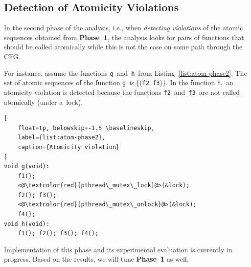 \documentclass{ExcelAtFIT}
\begin{document}
\subsection{Detection of Atomicity Violations}
\label{sec:atomicity-phase2}

In the second phase of the analysis, i.e.,
when \emph{detecting violations} of the atomic
sequences obtained from \textbf{Phase~1}, the
analysis looks for pairs of functions that should
be called atomically while this is not the case
on some path through the CFG.

For instance, assume the functions
\texttt{g}~and~\texttt{h}~from
Listing~\ref{list:atom-phase2}.
The set of atomic sequences of the
function \texttt{g}~is
\{(\texttt{f2}~\texttt{f3})\}. In the function
\texttt{h},~an atomicity violation is detected
because the functions
\texttt{f2}~and~\texttt{f3}~are not called
atomically (under a~lock).

\begin{lstlisting}[
    float=tp, belowskip=-1.5 \baselineskip,
    label={list:atom-phase2},
    caption={Atomicity violation}
]
void g(void):
    f1();
    <@\textcolor{red}{pthread\_mutex\_lock}@>(&lock);
    f2(); f3();
    <@\textcolor{red}{pthread\_mutex\_unlock}@>(&lock);
    f4();
void h(void):
    f1(); f2(); f3(); f4();
\end{lstlisting}

Implementation of this phase and its
experimental evaluation is currently in
progress. Based on the results, we will
tune \textbf{Phase~1} as well.


\end{document}
